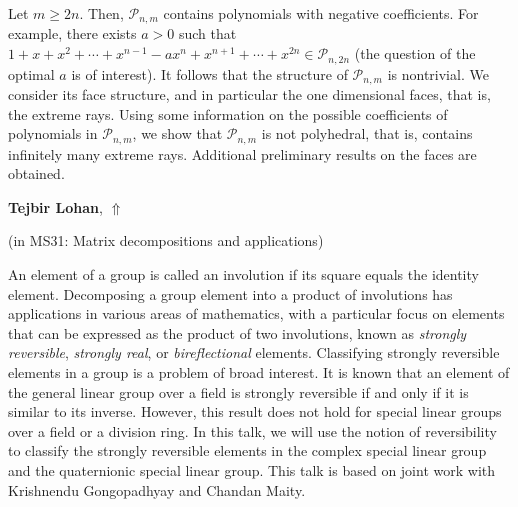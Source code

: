 \documentclass[ILAS2025-program.tex]{subfiles}
\begin{document}
\begin{ilasabstract}
\medskip
Let $m \geq 2n$. Then, ${\mathcal{P}}_{n,m}$ contains polynomials with negative coefficients. For example, there exists $a > 0$ such that $1+x+x^{2}+\cdots+x^{n-1}-ax^{n}+x^{n+1}+\cdots+x^{2n} \in {\mathcal{P}}_{n,2n}$ (the question of the optimal $a$ is of interest).
It follows that the structure of ${\mathcal{P}}_{n,m}$ is nontrivial. We consider its face structure, and in particular the one dimensional faces, that is, the extreme rays. Using some information on the possible coefficients of polynomials in  ${\mathcal{P}}_{n,m}$, we show that  ${\mathcal{P}}_{n,m}$ is not polyhedral, that is, contains infinitely many extreme rays. Additional preliminary results on the faces are obtained.\end{ilasabstract}
     \hypertarget{down0309}{}\begin{ilasabstract}
    
    \textbf{Tejbir Lohan},  \hfill \hyperlink{up0309}{$\Uparrow$}
    
    (in {\color{mstitle}MS31: Matrix decompositions and applications})
        
        \mtskip
    An element of a group is called an involution if its square equals the identity element. Decomposing a group element into a product of involutions has applications in various areas of mathematics, with a particular focus on elements that can be expressed as the product of two involutions, known as \textit{strongly reversible}, \textit{strongly real}, or \textit{bireflectional} elements. Classifying strongly reversible elements in a group is a problem of broad interest. It is known that an element of the general linear group over a field is strongly reversible if and only if it is similar to its inverse. However, this result does not hold for special linear groups over a field or a division ring. In this talk, we will use the notion of reversibility to classify the strongly reversible elements in the complex special linear group and the quaternionic special linear group. This talk is based on joint work with Krishnendu Gongopadhyay and Chandan Maity.
\end{ilasabstract}
\end{document}
